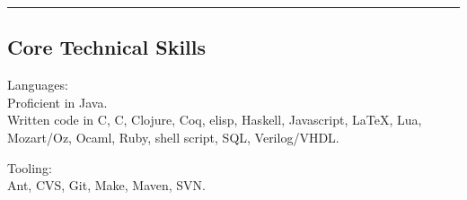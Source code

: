 \documentclass[10pt,letterpaper]{article}
\newenvironment{indentsection}[1]%
{\begin{list}{}%
	{\setlength{\leftmargin}{#1}}%
	\item[]%
}
{\end{list}}
\newcommand{\CPP}
{C\nolinebreak[4]\hspace{-.05em}\raisebox{.22ex}{\footnotesize\bf ++}}
\begin{document}
\hrule
\vspace{-0.4em}
\subsection*{Core Technical Skills}

\begin{indentsection}{\parindent}
\begin{description*}
	\item[Languages:] \ \\
	Proficient in Java. \\
	Written code in C, \CPP, Clojure, Coq, elisp, Haskell, Javascript, \LaTeX, Lua, Mozart/Oz, Ocaml, Ruby, shell script, SQL, Verilog/VHDL.
	\item[Tooling:] \ \\
	Ant, CVS, Git, Make, Maven, SVN. \\
\end{description*}
\end{indentsection}
\end{document}

